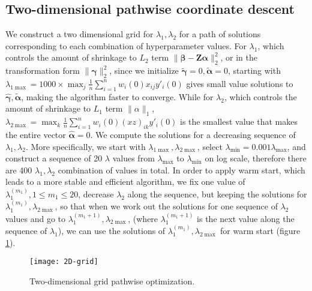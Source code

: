 \subsection{Two-dimensional pathwise coordinate descent}
\label{a.2}
We construct a two dimensional grid for $\lambda_1, \lambda_2$ for a path of solutions corresponding to each combination of hyperparameter values. For $\lambda_1$, which controls the amount of shrinkage to $L_2$ term $\|\bm{\beta}-\bm{Z\alpha}\|_2^2$, or in the transformation form $\|\bm{\gamma}\|_2^2$, since we initialize $\tilde{\bm{\gamma}}=0, \tilde{\bm{\alpha}}=0$, starting with $\lambda_{1\max}=1000\times \max_j\frac{1}{n}\sum_{i=1}^nw_i(0)x_{ij}y'_i(0)$ gives small value solutions to $\hat{\bm{\gamma}},\tilde{\bm{\alpha}}$, making the algorithm faster to converge. While for $\lambda_2$, which controls the amount of shrinkage to $L_1$ term $\|\alpha\|_1$, $\lambda_{2\max}=\max_k \frac{1}{n}\sum_{i=1}^n w_i(0)(xz)_{ik}y'_i(0)$ is the smallest value that makes the entire vector $\hat{\bm{\alpha}}=0$. We compute the solutions for a decreasing sequence of $\lambda_1,\lambda_2$. More specifically, we start with $\lambda_{1\max},\lambda_{2\max}$, select $\lambda_{\min}=0.001\lambda_{\max}$, and construct a sequence of 20 $\lambda$ values from $
\lambda_{\max}$ to $\lambda_{\min}$ on log scale, therefore there are 400 $\lambda_1,\lambda_2$ combination of values in total. In order to apply warm start, which leads to a more stable and efficient algorithm, we fix one value of $\lambda_1^{(m_1)}, 1\leq m_1\leq 20$, decrease $\lambda_2$ along the sequence, but keeping the solutions for $\lambda_{1}^{(m_1)}, \lambda_{2\max}$, so that when we work out the solutions for one sequence of $\lambda_2$ values and go to $\lambda_{1}^{(m_1+1)}, \lambda_{2\max}$, (where $\lambda_{1}^{(m_1+1)}$ is the next value along the sequence of $\lambda_1$), we can use the solutions of $\lambda_{1}^{(m_1)}, \lambda_{2\max}$ for warm start (figure \ref{fig:2d}).
\begin{figure}[tbh]
  \centering
  \texttt{[image: 2D-grid]}
  \caption[Two-dimensional grid pathwise optimization]{
    Two-dimensional grid pathwise optimization.
  }
  \label{fig:2d}
\end{figure}

